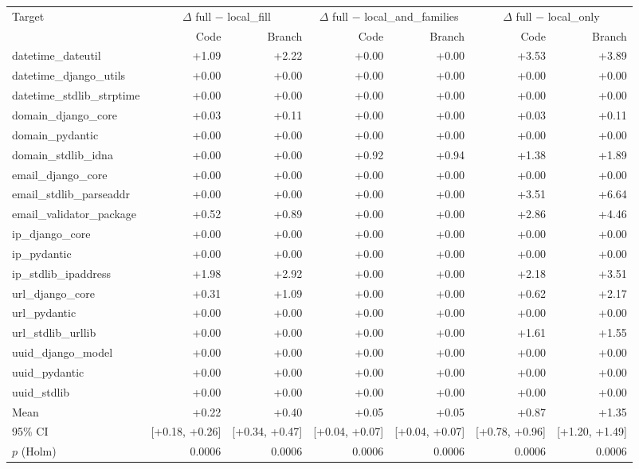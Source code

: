 \begin{tabular}{lrrrrrr}
\toprule
Target & \multicolumn{2}{c}{$\Delta$ full $-$ local\_fill} & \multicolumn{2}{c}{$\Delta$ full $-$ local\_and\_families} & \multicolumn{2}{c}{$\Delta$ full $-$ local\_only} \\
 & Code & Branch & Code & Branch & Code & Branch \\
\midrule
datetime\_dateutil & +1.09 & +2.22 & +0.00 & +0.00 & +3.53 & +3.89 \\
datetime\_django\_utils & +0.00 & +0.00 & +0.00 & +0.00 & +0.00 & +0.00 \\
datetime\_stdlib\_strptime & +0.00 & +0.00 & +0.00 & +0.00 & +0.00 & +0.00 \\
domain\_django\_core & +0.03 & +0.11 & +0.00 & +0.00 & +0.03 & +0.11 \\
domain\_pydantic & +0.00 & +0.00 & +0.00 & +0.00 & +0.00 & +0.00 \\
domain\_stdlib\_idna & +0.00 & +0.00 & +0.92 & +0.94 & +1.38 & +1.89 \\
email\_django\_core & +0.00 & +0.00 & +0.00 & +0.00 & +0.00 & +0.00 \\
email\_stdlib\_parseaddr & +0.00 & +0.00 & +0.00 & +0.00 & +3.51 & +6.64 \\
email\_validator\_package & +0.52 & +0.89 & +0.00 & +0.00 & +2.86 & +4.46 \\
ip\_django\_core & +0.00 & +0.00 & +0.00 & +0.00 & +0.00 & +0.00 \\
ip\_pydantic & +0.00 & +0.00 & +0.00 & +0.00 & +0.00 & +0.00 \\
ip\_stdlib\_ipaddress & +1.98 & +2.92 & +0.00 & +0.00 & +2.18 & +3.51 \\
url\_django\_core & +0.31 & +1.09 & +0.00 & +0.00 & +0.62 & +2.17 \\
url\_pydantic & +0.00 & +0.00 & +0.00 & +0.00 & +0.00 & +0.00 \\
url\_stdlib\_urllib & +0.00 & +0.00 & +0.00 & +0.00 & +1.61 & +1.55 \\
uuid\_django\_model & +0.00 & +0.00 & +0.00 & +0.00 & +0.00 & +0.00 \\
uuid\_pydantic & +0.00 & +0.00 & +0.00 & +0.00 & +0.00 & +0.00 \\
uuid\_stdlib & +0.00 & +0.00 & +0.00 & +0.00 & +0.00 & +0.00 \\
\midrule
Mean & +0.22 & +0.40 & +0.05 & +0.05 & +0.87 & +1.35 \\
95\% CI & [+0.18, +0.26] & [+0.34, +0.47] & [+0.04, +0.07] & [+0.04, +0.07] & [+0.78, +0.96] & [+1.20, +1.49] \\
$p$ (Holm) & 0.0006 & 0.0006 & 0.0006 & 0.0006 & 0.0006 & 0.0006 \\
\bottomrule
\end{tabular}
